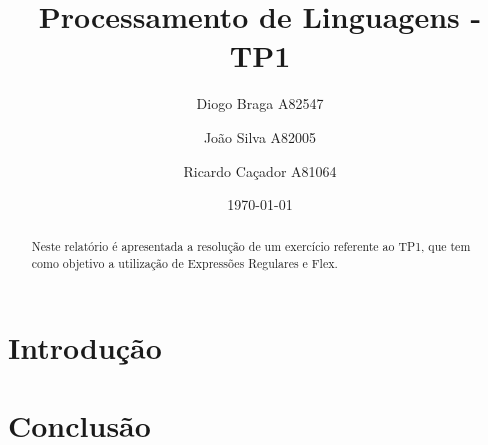 \documentclass[a4paper]{article}
\title{Processamento de Linguagens - TP1}
\author{Diogo Braga A82547 \and João Silva A82005 \and Ricardo Caçador A81064}
\date{\today}
\begin{document}
\maketitle

\begin{abstract}
Neste relatório é apresentada a resolução de um exercício referente ao TP1, que tem como objetivo a utilização de Expressões Regulares e Flex.
\end{abstract}

\tableofcontents

\newpage


\section{Introdução}
\label{sec:intro}

\section{Conclusão}
\label{sec:conclusao}
\end{document}
